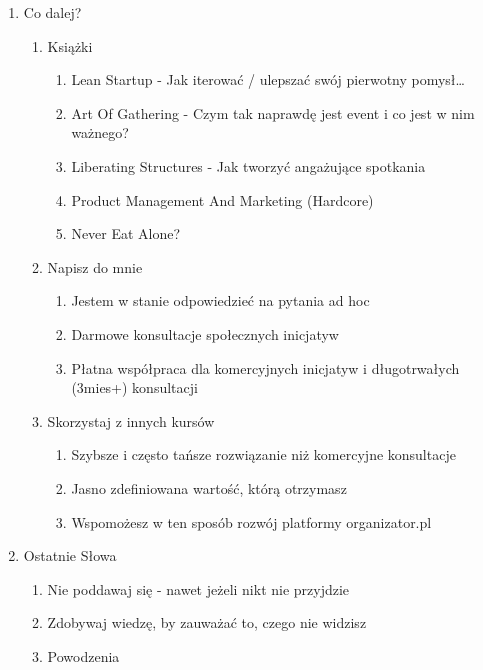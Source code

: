 \begin{enumerate}
  \begin{enumerate}
  \def\labelenumii{\arabic{enumii}.}
  \tightlist
  \item
    Co dalej?

    \begin{enumerate}
    \def\labelenumiii{\arabic{enumiii}.}
    \tightlist
    \item
      Książki

      \begin{enumerate}
      \def\labelenumiv{\arabic{enumiv}.}
      \tightlist
      \item
        Lean Startup - Jak iterować / ulepszać swój pierwotny
        pomysł\ldots{}
      \item
        Art Of Gathering - Czym tak naprawdę jest event i co jest w nim
        ważnego?
      \item
        Liberating Structures - Jak tworzyć angażujące spotkania
      \item
        Product Management And Marketing (Hardcore)
      \item
        Never Eat Alone?
      \end{enumerate}
    \item
      Napisz do mnie

      \begin{enumerate}
      \def\labelenumiv{\arabic{enumiv}.}
      \tightlist
      \item
        Jestem w stanie odpowiedzieć na pytania ad hoc
      \item
        Darmowe konsultacje społecznych inicjatyw
      \item
        Płatna współpraca dla komercyjnych inicjatyw i długotrwałych
        (3mies+) konsultacji
      \end{enumerate}
    \item
      Skorzystaj z innych kursów

      \begin{enumerate}
      \def\labelenumiv{\arabic{enumiv}.}
      \tightlist
      \item
        Szybsze i często tańsze rozwiązanie niż komercyjne konsultacje
      \item
        Jasno zdefiniowana wartość, którą otrzymasz
      \item
        Wspomożesz w ten sposób rozwój platformy organizator.pl
      \end{enumerate}
    \end{enumerate}
  \item
    Ostatnie Słowa

    \begin{enumerate}
    \def\labelenumiii{\arabic{enumiii}.}
    \tightlist
    \item
      Nie poddawaj się - nawet jeżeli nikt nie przyjdzie
    \item
      Zdobywaj wiedzę, by zauważać to, czego nie widzisz
    \item
      Powodzenia
    \end{enumerate}
  \end{enumerate}
\end{enumerate}
